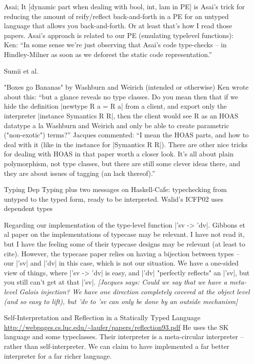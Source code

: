 \documentclass[preprint]{sigplanconf}
\newcommand{\jacques}[1]{{\it [Jacques says: #1]}}
\begin{document}
Asai; 
It [dynamic part when dealing with bool, int, lam in PE] is
Asai's trick for reducing the amount of reify/reflect back-and-forth
in a PE for an untyped language that allows you back-and-forth.  Or at
least that's how I read those papers.
Asai's approach is related to our PE (emulating typelevel functions):
Ken: ``In some sense we're just observing that Asai's code type-checks
-- in Hindley-Milner as soon as we deforest the static code
representation.''

Sumii et al.

"Boxes go Bananas" by Washburn and Weirich (intended or otherwise) Ken
wrote about this: ``but a glance reveals no type classes.  Do you mean
then that if we hide the definition |newtype R a = R a| from a client,
and export only the interpreter |instance Symantics R R|, then the
client would see R as an HOAS datatype a la Washburn and Weirich and
only be able to create parametric ("non-exotic") terms?''  Jacques
commented: ``I mean the HOAS parts, and how to deal with it (like in
the instance for |Symantics R R|).  There are other nice tricks for
dealing with HOAS in that paper worth a closer look.  It's all about
plain polymorphism, not type classes, but there are still some clever
ideas there, and they are about issues of tagging (an lack thereof).''

Typing Dep Typing plus two messages on Haskell-Cafe: typechecking 
from untyped to the typed form, ready to be interpreted. Walid's ICFP02
uses dependent types

Regarding our implementation of the type-level function |'sv -> 'dv|.
Gibbons et al paper on
the implementations of typecase may be relevant. I have not read it,
but I have the feeling some of their typecase designs may be
relevant (at least to cite). 
However, the typecase paper relies on having a 
bijection between types -- our |'sv| and |'dv| in this case, which is not 
our situation.  We have a one-sided view of things, where |'sv -> 'dv| is 
easy, and |'dv| "perfectly reflects" an |'sv|, but you still can't get at 
that |'sv|.  \jacques{Could we say that we have a meta-level Galois
injection?  We have one direction completely covered at the object
level (and so easy to lift), but 'dv to 'sv can only be done by
an outside mechanism}


Self-Interpretation and Reflection in a Statically Typed Language 
\url{http://webpages.cs.luc.edu/~laufer/papers/reflection93.pdf}
He uses the SK language and some typeclasses. Their interpreter is a
meta-circular interpreter -- rather than self-interpreter. We can
claim to have implemented a far better interpreter for a far richer
language.
\end{document}
